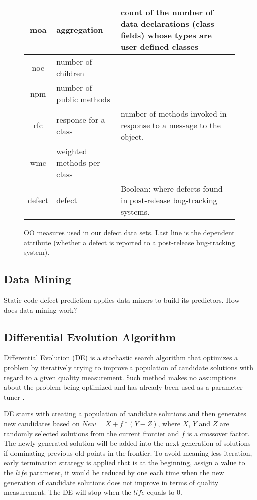 \documentclass{sig-alternative}
\begin{document}
\begin{figure*}[!t]
\begin{center}
{\begin{tabular}{c|l|p{4in}}
moa &  aggregation &  count of the number of data declarations (class
fields) whose types are user defined classes\\\hline
noc &  number of children &\\\hline
npm & number of public methods & \\\hline
rfc & response for a class &number of  methods invoked in response to
a message to the object.\\\hline
wmc & weighted methods per class &\\\hline
\rowcolor{lightgray}
defect & defect & Boolean: where defects found in post-release bug-tracking systems.
\end{tabular}
}
\end{center}
\caption{OO measures used in our defect data sets.  Last line is
the dependent attribute (whether a defect is reported to  a
post-release bug-tracking system).}\label{fig:ck}
\end{figure*}




 

\subsection{Data Mining}
Static code defect prediction applies data miners to build its predictors. How does data mining work?




\subsection{Differential Evolution Algorithm}
Differential Evolution (DE)\cite{storn1997differential} is a stochastic search algorithm that 
optimizes a problem by iteratively trying to improve a  population of candidate solutions with 
regard to a given quality measurement. Such method makes no assumptions about the 
problem being optimized and has already been used as a parameter tuner
\cite{omran2005differential, chiha2012tuning}.

DE starts with creating a population of candidate solutions and then generates new 
candidates based on $New = X+f*(Y-Z)$, where $X$, $Y$ and $Z$ are randomly selected 
solutions from the current frontier and $f$ is a crossover factor. The newly generated solution 
will be added into the next generation of solutions if dominating previous old points in the 
frontier. To avoid meaning less iteration, early termination strategy is applied that is at the 
beginning, assign a value to the $life$ parameter, it would be reduced by one each time   
when the new generation of candidate solutions does not improve in terms of quality 
measurement. The DE will stop when the $life$ equals to 0.
\end{document}
